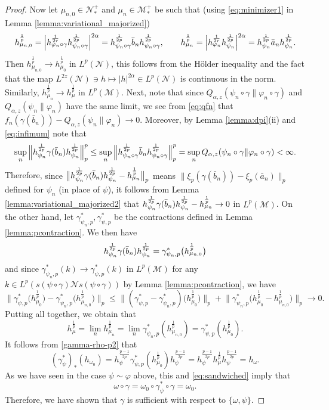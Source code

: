\documentclass[12pt]{article}
\theoremstyle{definition}
\theoremstyle{remark}
\numberwithin{equation}{section}
\def\Me{\mathcal M}
\def\Ne{\mathcal N}
\def\ffi{\varphi}
\begin{document}
\begin{proof}
Now let $\mu_{n,0}\in \Ne_*^+$ and $\mu_n\in \Me_*^+$ be such that (using  \eqref{eq:minimizer1}
in Lemma \ref{lemma:variational_majorized})
\begin{align*}
h_{\mu_{n,0}}^{\frac 1p}=
\Big|h_{\ffi_n\circ\gamma}^{1\over 2r}h_{\psi_n\circ\gamma}^{1\over 2p}\Big|^{2\alpha}=
h_{\psi_n\circ\gamma}^{\frac 1{2p}}\bar b_{n}
h_{\psi_n\circ\gamma}^{\frac1{2p}},\qquad
h_{\mu_{n}}^{\frac1p}=\Big|h_{\ffi_n}^{1\over 2r}h_{\psi_n}^{1\over 2p}\Big|^{2\alpha}=
h_{\psi_n}^{\frac 1{2p}}\bar a_{n}h_{\psi_n}^{\frac1{2p}}. 
\end{align*}
Then $h_{\mu_{n,0}}^{\frac1p}\to h_{\mu_0}^{\frac1p}$ in $L^p(\Ne)$, this follows from the H\"older
inequality and the fact \cite{kosaki1984applicationsuc} that the map
$L^{2z}(\Ne)\ni h\mapsto |h|^{2\alpha}\in L^p(\Ne)$ is continuous in the norm. Similarly,
$h_{\mu_n}^{\frac1p}\to h_\mu^{\frac1p}$ in $L^p(\Me)$. 
Next, note that since
$Q_{\alpha,z}(\psi_n\circ\gamma\|\ffi_n\circ\gamma)$ and $Q_{\alpha,z}(\psi_n\|\ffi_n)$
have the same limit, we see from \eqref{eq:qfn} that
$f_n(\gamma(\bar b_{n}))-Q_{\alpha,z}(\psi_n\|\ffi_n)\to0$.
Moreover, by Lemma \ref{lemma:dpi}(ii) and \eqref{eq:infimum} note that
\[
\sup_n\Big\|h_{\psi_n}^{\frac 1{2p}}\gamma(\bar b_{n})h_{\psi_n}^{1\over 2p}\Big\|_p^p
\le\sup_n\Big\|h_{\psi_n\circ\gamma}^{\frac 1{2p}}\bar b_{n}
h_{\psi_n\circ\gamma}^{\frac 1{2p}}\Big\|_p^p
=\sup_nQ_{\alpha,z}(\psi_n\circ\gamma\|\ffi_n\circ\gamma)<\infty.
\]
Therefore, {since
$\big\|h_{\psi_n}^{\frac 1{2p}}\gamma(\bar b_{n})h_{\psi_n}^{1\over 2p}-h_{\mu_n}^{\frac1p}\big\|_p$
means $\|\xi_p(\gamma(\bar b_n))-\xi_p(\bar a_n)\|_p$ defined for $\psi_n$ (in place of $\psi$),
it follows} from Lemma \ref{lemma:variational_majorized2} that 
$h_{\psi_n}^{\frac 1{2p}}\gamma(\bar b_{n})h_{\psi_n}^{1\over 2p}-h_{\mu_n}^{\frac1p}\to
0$ in $L^p(\Me)$.  On the other hand, let $\gamma^*_{\psi_n,p}, \gamma^*_{\psi,p}$ be the
contractions defined in Lemma \ref{lemma:pcontraction}. We
then have 
\[
h_{\psi_n}^{\frac 1{2p}}\gamma(\bar b_{n})h_{\psi_n}^{1\over
2p}=\gamma_{\psi_{n},p}^*\bigl(h_{\mu_{n,0}}^{\frac1p}\bigr)
\]
and since $\gamma^*_{\psi_{n},p}(k)\to \gamma^*_{\psi,p}(k)$ in $L^p(\Me)$ for any
$k\in L^p(s(\psi\circ\gamma)\Ne s(\psi\circ\gamma))$ by Lemma \ref{lemma:pcontraction}, we have  
\[
\Big\|\gamma^*_{\psi,p}\bigl(h_{\mu_0}^{\frac1p}\bigr)-
\gamma_{\psi_{n},p}^*\bigl(h_{\mu_{n,0}}^{\frac1p}\bigr)\Big\|_p\le
\Big\|(\gamma^*_{\psi,p}-\gamma^*_{\psi_{n},p})\bigl(h_{\mu_0}^{\frac1p}\bigr)\Big\|_p+
\Big\|\gamma^*_{\psi_{n},p}\bigl(h_{\mu_0}^{\frac1p}-h_{\mu_{n,0}}^{\frac1p}\bigr)\Big\|_p\to 0.
\]
Putting all together, we obtain that 
\[
h_\mu^{\frac1p}=\lim_n h_{\mu_n}^{\frac1p}=\lim_n
\gamma^*_{\psi_{n},p}(h_{\mu_{n,0}}^{\frac1p})=\gamma^*_{\psi,p}(h_{\mu_0}^{\frac1p}).
\]
It follows from \eqref{gamma-rho-p2} that 
\[
(\gamma^*_{\psi})_*(h_{\omega_0})=
h_{\psi}^{\frac{p-1}{2p}}\gamma^*_{\psi,p}(h_{\mu_0}^{\frac1p})h_{\psi}^{\frac{p-1}{2p}}=
h_{\psi}^{\frac{p-1}{2p}}h_\mu^{\frac1p}h_{\psi}^{\frac{p-1}{2p}}=h_\omega.
\]
As we have seen {in the case $\psi\sim \ffi$ above,} this and \eqref{eq:sandwiched} imply that
\[
\omega\circ\gamma= \omega_0\circ \gamma_\psi^*\circ\gamma=\omega_0.
\]
{Therefore, we have shown that $\gamma$ is sufficient with respect to $\{\omega,\psi\}$.}


\end{proof}
\end{document}
